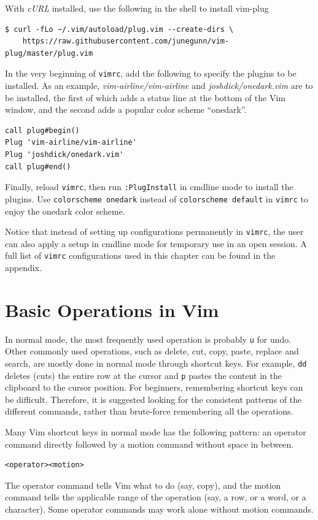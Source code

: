With \textit{cURL} installed, use the following in the shell to install vim-plug
\begin{lstlisting}
$ curl -fLo ~/.vim/autoload/plug.vim --create-dirs \
    https://raw.githubusercontent.com/junegunn/vim-plug/master/plug.vim
\end{lstlisting}
In the very beginning of \verb|vimrc|, add the following to specify the plugins to be installed. As an example, \textit{vim-airline/vim-airline} and \textit{joshdick/onedark.vim} are to be installed, the first of which adds a status line at the bottom of the Vim window, and the second adds a popular color scheme ``onedark''.
\begin{lstlisting}
call plug#begin()
Plug 'vim-airline/vim-airline'
Plug 'joshdick/onedark.vim'
call plug#end()
\end{lstlisting}
Finally, reload \verb|vimrc|, then run \verb|:PlugInstall| in cmdline mode to install the plugins. Use \verb|colorscheme onedark| instead of \verb|colorscheme default| in \verb|vimrc| to enjoy the onedark color scheme.

Notice that instead of setting up configurations permanently in \verb|vimrc|, the user can also apply a setup in cmdline mode for temporary use in an open session. A full list of \verb|vimrc| configurations used in this chapter can be found in the appendix.

\section{Basic Operations in Vim}

In normal mode, the most frequently used operation is probably \verb|u| for undo. Other commonly used operations, such as delete, cut, copy, paste, replace and search, are mostly done in normal mode through shortcut keys. For example, \verb|dd| deletes (cuts) the entire row at the cursor and \verb|p| pastes the content in the clipboard to the cursor position. For beginners, remembering shortcut keys can be difficult. Therefore, it is suggested looking for the consistent patterns of the different commands, rather than brute-force remembering all the operations.

Many Vim shortcut keys in normal mode has the following pattern: an operator command directly followed by a motion command without space in between.
\begin{lstlisting}
<operator><motion>
\end{lstlisting}
The operator command tells Vim what to do (say, copy), and the motion command tells the applicable range of the operation (say, a row, or a word, or a character). Some operator commands may work alone without motion commands.

